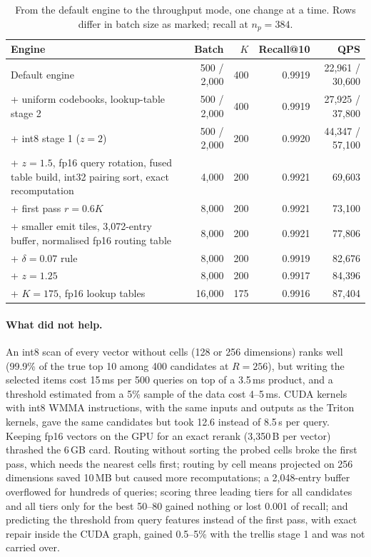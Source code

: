 \documentclass[10pt]{article}
\begin{document}
\begin{table}[!htbp]
\caption{From the default engine to the throughput mode, one change at a time. Rows differ in batch size as marked; recall at $n_p=384$.}
\label{tab:tput2}
\small
\begin{tabular}{p{7.6cm}rrrr}
\toprule
Engine & Batch & $K$ & Recall@10 & QPS \\
\midrule
Default engine & 500 / 2{,}000 & 400 & 0.9919 & 22{,}961 / 30{,}600 \\
+ uniform codebooks, lookup-table stage 2 & 500 / 2{,}000 & 400 & 0.9919 & 27{,}925 / 37{,}800 \\
+ int8 stage 1 ($z=2$) & 500 / 2{,}000 & 200 & 0.9920 & 44{,}347 / 57{,}100 \\
+ $z=1.5$, fp16 query rotation, fused table build, int32 pairing sort, exact recomputation & 4{,}000 & 200 & 0.9921 & 69{,}603 \\
+ first pass $r=0.6K$ & 8{,}000 & 200 & 0.9921 & 73{,}100 \\
+ smaller emit tiles, 3{,}072-entry buffer, normalised fp16 routing table & 8{,}000 & 200 & 0.9921 & 77{,}806 \\
+ $\delta=0.07$ rule & 8{,}000 & 200 & 0.9919 & 82{,}676 \\
+ $z=1.25$ & 8{,}000 & 200 & 0.9917 & 84{,}396 \\
+ $K=175$, fp16 lookup tables & 16{,}000 & 175 & 0.9916 & 87{,}404 \\
\bottomrule
\end{tabular}
\end{table}

\paragraph{What did not help.} An int8 scan of every vector without cells (128 or 256 dimensions) ranks well (99.9\% of the true top 10 among 400 candidates at $R=256$), but writing the selected items cost 15\,ms per 500 queries on top of a 3.5\,ms product, and a threshold estimated from a 5\% sample of the data cost 4--5\,ms. CUDA kernels with int8 WMMA instructions, with the same inputs and outputs as the Triton kernels, gave the same candidates but took 12.6 instead of 8.5\,\textmu s per query. Keeping fp16 vectors on the GPU for an exact rerank (3{,}350\,B per vector) thrashed the 6\,GB card. Routing without sorting the probed cells broke the first pass, which needs the nearest cells first; routing by cell means projected on 256 dimensions saved 10\,MB but caused more recomputations; a 2{,}048-entry buffer overflowed for hundreds of queries; scoring three leading tiers for all candidates and all tiers only for the best 50--80 gained nothing or lost 0.001 of recall; and predicting the threshold from query features instead of the first pass, with exact repair inside the CUDA graph, gained 0.5--5\% with the trellis stage 1 and was not carried over.
\end{document}
